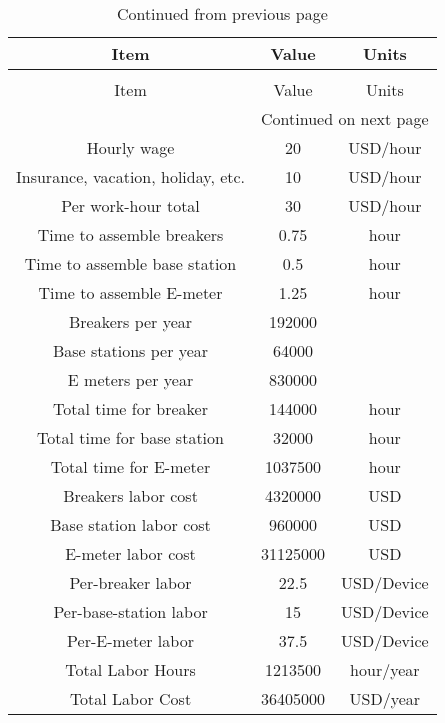 {
\small
\begin{longtable}[c]{|c|c|c|}
\caption{Assembly Costs\label{tab:02_Assembly}}\\
\hline
\rowcolor{lightgray}
 Item & Value & Units \\ \hline\hline
\hline
\endfirsthead

\caption[]{Continued from previous page}\\
\hline
\rowcolor{lightgray}
 Item & Value & Units \\ \hline\hline
\hline
\endhead

\multicolumn{3}{r}{{Continued on next page}} \\
\endfoot

\endlastfoot

Hourly wage & 20	 & USD/hour \\
Insurance, vacation, holiday, etc. & 10 & USD/hour \\
Per work-hour total & 30 & USD/hour \\ \hline
Time to assemble breakers & 0.75 & hour \\
Time to assemble base station & 0.5 & hour \\
Time to assemble E-meter & 1.25 & hour \\ \hline
Breakers per year & 192000 & \\
Base stations per year & 64000 & \\
E meters per year & 830000 & \\ \hline
Total time for breaker & 144000 & hour \\
Total time for base station & 32000 & hour \\
Total time for E-meter & 1037500 & hour \\ \hline
Breakers labor cost & 4320000 & USD \\
Base station labor cost & 960000 & USD \\
E-meter labor cost & 31125000 & USD \\ \hline
Per-breaker labor & 22.5 & USD/Device \\
Per-base-station labor & 15 & USD/Device \\
Per-E-meter labor & 37.5 & USD/Device \\ \hline\hline
Total Labor Hours & 1213500 & hour/year \\
Total Labor Cost & 36405000 & USD/year \\
\hline
\end{longtable}
}
